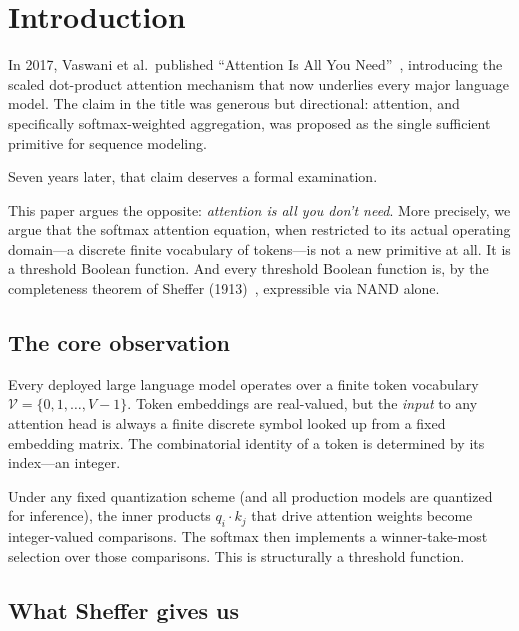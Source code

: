 \documentclass[11pt]{article}
\theoremstyle{definition}
\begin{document}
\tableofcontents
\newpage

\section{Introduction}
\label{sec:intro}

In 2017, Vaswani et al.\ published ``Attention Is All You Need''~\cite{vaswani2017},
introducing the scaled dot-product attention mechanism that now underlies
every major language model. The claim in the title was generous but directional:
attention, and specifically softmax-weighted aggregation, was proposed as the
single sufficient primitive for sequence modeling.

Seven years later, that claim deserves a formal examination.

This paper argues the opposite: \emph{attention is all you don't need}.
More precisely, we argue that the softmax attention equation, when restricted
to its actual operating domain—a discrete finite vocabulary of tokens—is not
a new primitive at all. It is a threshold Boolean function. And every threshold
Boolean function is, by the completeness theorem of Sheffer (1913)~\cite{sheffer1913},
expressible via NAND alone.

\subsection{The core observation}

Every deployed large language model operates over a finite token vocabulary
$\mathcal{V} = \{0, 1, \ldots, V{-}1\}$.
Token embeddings are real-valued, but the \emph{input} to any attention head
is always a finite discrete symbol looked up from a fixed embedding matrix.
The combinatorial identity of a token is determined by its index—an integer.

Under any fixed quantization scheme (and all production models are quantized
for inference), the inner products $q_i \cdot k_j$ that drive attention weights
become integer-valued comparisons. The softmax then implements a winner-take-most
selection over those comparisons. This is structurally a threshold function.

\subsection{What Sheffer gives us}
\end{document}
